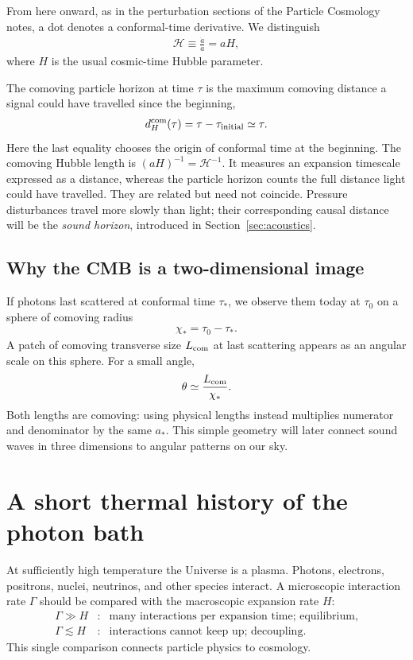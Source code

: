 \documentclass[12pt]{article}
\newcommand{\be}{\begin{eqnarray}}
\newcommand{\non}{\nonumber\\}
\newcommand{\ee}{\end{eqnarray}}
\newcommand{\Hs}{\mathcal H}
\begin{document}
From here onward, as in the perturbation sections of the Particle Cosmology notes,
a dot denotes a conformal-time derivative. We distinguish
\be
\Hs\equiv\frac{\dot a}{a}=aH,
\ee
where $H$ is the usual cosmic-time Hubble parameter.

The comoving particle horizon at time $\tau$ is the maximum comoving distance a signal
could have travelled since the beginning,
\be
d_H^{\rm com}(\tau)=\tau-\tau_{\rm initial}\simeq\tau.
\ee
Here the last equality chooses the origin of conformal time at the beginning.
The comoving Hubble length is $(aH)^{-1}=\Hs^{-1}$. It measures an expansion
timescale expressed as a distance, whereas the particle horizon counts the full
distance light could have travelled. They are related but need not coincide.
Pressure disturbances travel more slowly than light; their corresponding causal
distance will be the \emph{sound horizon}, introduced in Section~\ref{sec:acoustics}.

\subsection{Why the CMB is a two-dimensional image}
If photons last scattered at conformal time $\tau_*$, we observe them today at
$\tau_0$ on a sphere of comoving radius
\be
\boxed{\chi_*=\tau_0-\tau_*.}
\ee
A patch of comoving transverse size $L_{\rm com}$ at last scattering appears as an
angular scale on this sphere. For a small angle,
\be
\theta\simeq\frac{L_{\rm com}}{\chi_*}.
\ee
Both lengths are comoving: using physical lengths instead multiplies numerator and
denominator by the same $a_*$. This simple geometry will later connect sound waves
in three dimensions to angular patterns on our sky.

\section{A short thermal history of the photon bath}

At sufficiently high temperature the Universe is a plasma. Photons, electrons,
positrons, nuclei, neutrinos, and other species interact. A microscopic interaction
rate $\Gamma$ should be compared with the macroscopic expansion rate $H$:
\be
\Gamma\gg H &: & \text{many interactions per expansion time; equilibrium},\non
\Gamma\lesssim H &: & \text{interactions cannot keep up; decoupling}.
\ee
This single comparison connects particle physics to cosmology.
\end{document}
